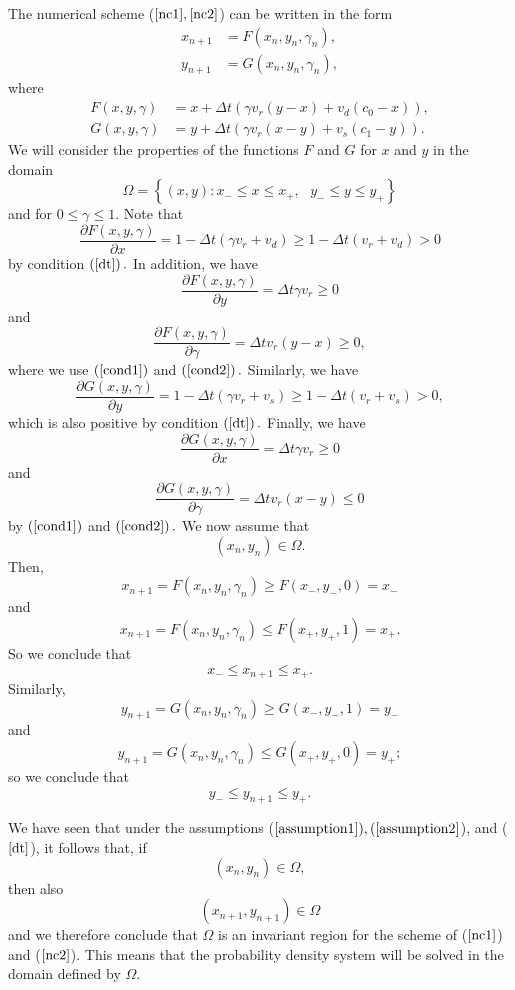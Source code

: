 The numerical scheme ($\ref{nc1}, \ref{nc2}$) can be written in the form%
\begin{align*}
x_{n+1}  &  =F(x_{n},y_{n},\gamma_{n}),\\
y_{n+1}  &  =G(x_{n},y_{n},\gamma_{n}),
\end{align*}
where%
\begin{align*}
F(x,y,\gamma) &  =x+\Delta t\left(  \gamma v_{r}\left(  y-x\right)
+v_{d}\left(  c_{0}-x\right)  \right),  \\
G(x,y,\gamma) &  =y+\Delta t\left(  \gamma v_{r}\left(  x-y\right)
+v_{s}\left(  c_{1}-y\right)  \right).
\end{align*}
We will consider the properties of the functions $F$ and $G$ for $x$ and $y$
in the domain
\begin{equation}
\Omega=\left\{  (x,y):x_{-}\leq x\leq x_{+},\text{ }y_{-}\leq y\leq
y_{+}\right\}  \label{cond2}%
\end{equation}
and for $0\leq\gamma\leq1.$ Note that%
\[
\frac{\partial F(x,y,\gamma)}{\partial x}=1-\Delta t\left(  \gamma v_{r}%
+v_{d}\right)  \geq1-\Delta t\left(  v_{r}+v_{d}\right)  >0
\]
by condition $\left(  \ref{dt}\right)  .$ In addition, we have%
\[
\frac{\partial F(x,y,\gamma)}{\partial y}=\Delta t\gamma v_{r}\geq0
\]
and
\[
\frac{\partial F(x,y,\gamma)}{\partial\gamma}=\Delta tv_{r}\left(  y-x\right)
\geq0,
\]
where we use $\left(  \ref{cond1}\right)$ and $\left(\ref{cond2}\right).$ Similarly, we
have%
\[
\frac{\partial G(x,y,\gamma)}{\partial y}=1-\Delta t\left(  \gamma
v_{r}+v_{s}\right)  \geq1-\Delta t\left(  v_{r}+v_{s}\right)  >0,
\]
which is also positive by condition $\left(  \ref{dt}\right).$ Finally,
we have
\[
\frac{\partial G(x,y,\gamma)}{\partial x}=\Delta t\gamma v_{r}\geq0
\]
and%
\[
\frac{\partial G(x,y,\gamma)}{\partial\gamma}=\Delta t v_{r}\left(
x-y\right)  \leq0
\]
by $\left(  \ref{cond1}\right)$ and $\left(\ref{cond2}\right).$ We now assume that%
\[
(x_{n},y_{n})\in\Omega.
\]
Then,%
\[
x_{n+1}=F(x_{n},y_{n},\gamma_{n})\geq F(x_{-},y_{-},0)=x_{-}
\]
and%
\[
x_{n+1}=F(x_{n},y_{n},\gamma_{n})\leq F(x_{+},y_{+},1)=x_{+}.%
\]
So we conclude that%
\[
x_{-}\leq x_{n+1}\leq x_{+}.
\]
Similarly,%
\[
y_{n+1}=G(x_{n},y_{n},\gamma_{n})\geq G(x_{-},y_{-},1)=y_{-}%
\]
and%
\[
y_{n+1}=G(x_{n},y_{n},\gamma_{n})\leq G(x_{+},y_{+},0)=y_{+};
\]
so we conclude that%
\[
y_{-}\leq y_{n+1}\leq y_{+}.
\]

We have seen that under the assumptions ($\ref{assumption1}), (\ref{assumption2}$), and ($\ref{dt}$), it follows that, if
\bigskip%
\[
(x_{n},y_{n})\in\Omega,
\]
then also
\[
(x_{n+1},y_{n+1})\in\Omega
\]
and we therefore conclude that $\Omega$ is an invariant region for the scheme of
($\ref{nc1}$) and ($\ref{nc2}$). This means that the probability density system will be solved in the
domain defined by $\Omega.$

